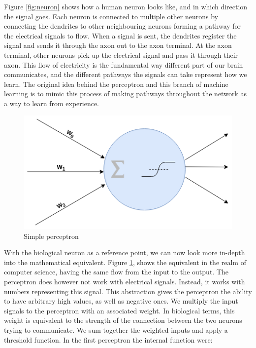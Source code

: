 Figure \ref{fig:neuron} shows how a human neuron looks like, and in which direction the signal goes. Each neuron is connected to multiple other neurons by connecting the dendrites to other neighbouring neurons forming a pathway for the electrical signals to flow. 
When a signal is sent, the dendrites register the signal and sends it through the axon out to the axon terminal. At the axon terminal, other neurons pick up the electrical signal and pass it through their axon.
This flow of electricity is the fundamental way different part of our brain communicates, and the different pathways the signals can take represent how we learn. The original idea behind the perceptron and this branch of machine learning is to mimic this process of making pathways throughout the network as a way to learn from experience.


\begin{figure}
        \centering
        \includegraphics[scale=0.5]{background/figures/perceptron.png}
        \caption{Simple perceptron}
    \label{fig:perceptron}
\end{figure}




With the biological neuron as a reference point, we can now look more in-depth into the mathematical equivalent. 
Figure \ref{fig:perceptron}, shows the equivalent in the realm of computer science, having the same flow from the input to the output. 
The perceptron does however not work with electrical signals. Instead, it works with numbers representing this signal. This abstraction gives the perceptron the ability to have arbitrary high values, as well as negative ones. 
We multiply the input signals to the perceptron with an associated weight. In biological terms, this weight is equivalent to the strength of the connection between the two neurons trying to communicate. We sum together the weighted inputs and apply a threshold function. In the first perceptron the internal function were:



